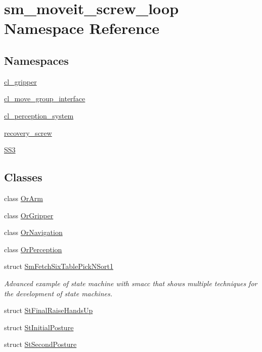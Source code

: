 \hypertarget{namespacesm__moveit__screw__loop}{}\section{sm\+\_\+moveit\+\_\+screw\+\_\+loop Namespace Reference}
\label{namespacesm__moveit__screw__loop}
\subsection*{Namespaces}
\begin{DoxyCompactItemize}
\item 
 \hyperlink{namespacesm__moveit__screw__loop_1_1cl__gripper}{cl\+\_\+gripper}
\item 
 \hyperlink{namespacesm__moveit__screw__loop_1_1cl__move__group__interface}{cl\+\_\+move\+\_\+group\+\_\+interface}
\item 
 \hyperlink{namespacesm__moveit__screw__loop_1_1cl__perception__system}{cl\+\_\+perception\+\_\+system}
\item 
 \hyperlink{namespacesm__moveit__screw__loop_1_1recovery__screw}{recovery\+\_\+screw}
\item 
 \hyperlink{namespacesm__moveit__screw__loop_1_1SS3}{S\+S3}
\end{DoxyCompactItemize}
\subsection*{Classes}
\begin{DoxyCompactItemize}
\item 
class \hyperlink{classsm__moveit__screw__loop_1_1OrArm}{Or\+Arm}
\item 
class \hyperlink{classsm__moveit__screw__loop_1_1OrGripper}{Or\+Gripper}
\item 
class \hyperlink{classsm__moveit__screw__loop_1_1OrNavigation}{Or\+Navigation}
\item 
class \hyperlink{classsm__moveit__screw__loop_1_1OrPerception}{Or\+Perception}
\item 
struct \hyperlink{structsm__moveit__screw__loop_1_1SmFetchSixTablePickNSort1}{Sm\+Fetch\+Six\+Table\+Pick\+N\+Sort1}
\begin{DoxyCompactList}\small\item\em Advanced example of state machine with smacc that shows multiple techniques for the development of state machines. \end{DoxyCompactList}\item 
struct \hyperlink{structsm__moveit__screw__loop_1_1StFinalRaiseHandsUp}{St\+Final\+Raise\+Hands\+Up}
\item 
struct \hyperlink{structsm__moveit__screw__loop_1_1StInitialPosture}{St\+Initial\+Posture}
\item 
struct \hyperlink{structsm__moveit__screw__loop_1_1StSecondPosture}{St\+Second\+Posture}
\end{DoxyCompactItemize}
